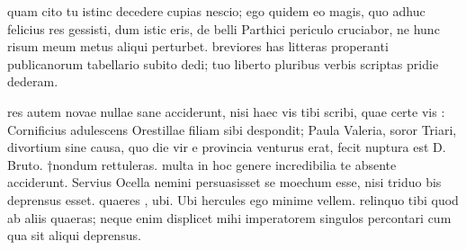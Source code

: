 


 quam cito tu istinc decedere cupias nescio; ego quidem eo magis, quo adhuc felicius res gessisti, dum istic eris, de belli Parthici periculo cruciabor, ne hunc risum meum metus aliqui perturbet. breviores has litteras properanti publicanorum tabellario subito dedi; tuo liberto pluribus verbis scriptas pridie dederam.

 res autem novae nullae sane acciderunt, nisi haec vis tibi scribi, quae certe vis : Cornificius adulescens Orestillae filiam sibi despondit; Paula Valeria, soror Triari, divortium sine causa, quo die vir e provincia venturus erat, fecit nuptura est D. Bruto. †nondum rettuleras. multa in hoc genere incredibilia te absente acciderunt. Servius Ocella nemini persuasisset se moechum esse, nisi triduo bis deprensus esset. quaeres , ubi. Ubi hercules ego minime vellem. relinquo tibi quod ab aliis quaeras; neque enim displicet mihi imperatorem singulos percontari cum qua sit aliqui deprensus.
